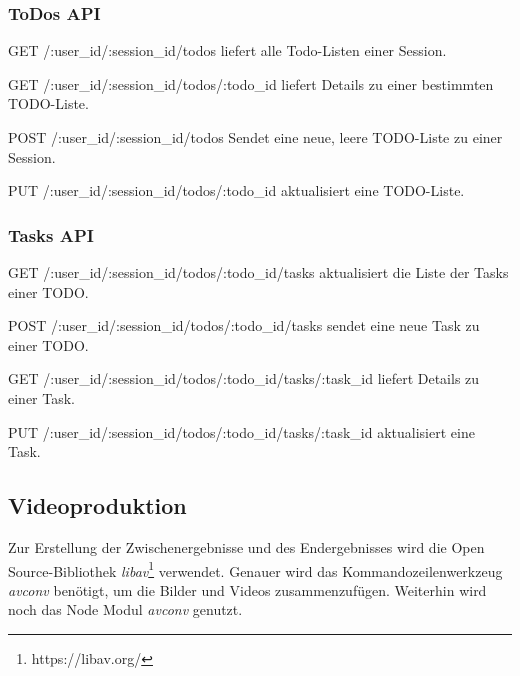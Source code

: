 \subsubsection{ToDos API}

\begin{compactdesc}

	\item[GET /:user\_id/:session\_id/todos] liefert alle Todo-Listen einer Session.
	\item[GET /:user\_id/:session\_id/todos/:todo\_id] liefert Details zu einer bestimmten TODO-Liste.
	\item[POST /:user\_id/:session\_id/todos] Sendet eine neue, leere TODO-Liste zu einer Session.
	
	\item[PUT /:user\_id/:session\_id/todos/:todo\_id] aktualisiert eine TODO-Liste.
	
\end{compactdesc}

\subsubsection{Tasks API}

\begin{compactdesc}

	\item[GET /:user\_id/:session\_id/todos/:todo\_id/tasks] aktualisiert die Liste der Tasks einer TODO.
	\item[POST /:user\_id/:session\_id/todos/:todo\_id/tasks] sendet eine neue Task zu einer TODO.
	
	\item[GET /:user\_id/:session\_id/todos/:todo\_id/tasks/:task\_id] liefert Details zu einer Task.
	
	\item[PUT /:user\_id/:session\_id/todos/:todo\_id/tasks/:task\_id] aktualisiert eine Task.
	  
\end{compactdesc}

\subsection{Videoproduktion}

Zur Erstellung der Zwischenergebnisse und des Endergebnisses wird die Open Source-Bibliothek \emph{libav}\footnote{https://libav.org/} verwendet. 
Genauer wird das Kommandozeilenwerkzeug \textit{avconv} benötigt, um die Bilder und Videos zusammenzufügen. 
Weiterhin wird noch das Node Modul \emph{avconv} genutzt. 

